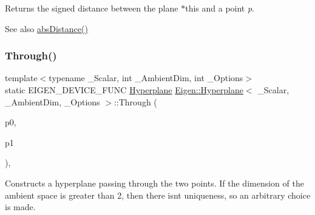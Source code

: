 \begin{DoxyReturn}{Returns}
the signed distance between the plane {\ttfamily $\ast$this} and a point {\itshape p}. 
\end{DoxyReturn}
\begin{DoxySeeAlso}{See also}
\mbox{\hyperlink{class_eigen_1_1_hyperplane_a95047840f0caed0bcb4f3ead9215d7b8}{abs\+Distance()}} 
\end{DoxySeeAlso}
\mbox{\label{class_eigen_1_1_hyperplane_ae0e7dc262623fc937b1b051595b8d3f1}} 
\subsubsection{\texorpdfstring{Through()}{Through()}\hspace{0.1cm}{\footnotesize\ttfamily [1/2]}}
{\footnotesize\ttfamily template$<$typename \+\_\+\+Scalar, int \+\_\+\+Ambient\+Dim, int \+\_\+\+Options$>$ \\
static E\+I\+G\+E\+N\+\_\+\+D\+E\+V\+I\+C\+E\+\_\+\+F\+U\+NC \mbox{\hyperlink{class_eigen_1_1_hyperplane}{Hyperplane}} \mbox{\hyperlink{class_eigen_1_1_hyperplane}{Eigen\+::\+Hyperplane}}$<$ \+\_\+\+Scalar, \+\_\+\+Ambient\+Dim, \+\_\+\+Options $>$\+::Through (\begin{DoxyParamCaption}\item[{const \mbox{\hyperlink{class_eigen_1_1_matrix}{Vector\+Type}} \&}]{p0,  }\item[{const \mbox{\hyperlink{class_eigen_1_1_matrix}{Vector\+Type}} \&}]{p1 }\end{DoxyParamCaption})\hspace{0.3cm}{\ttfamily [inline]}, {\ttfamily [static]}}

Constructs a hyperplane passing through the two points. If the dimension of the ambient space is greater than 2, then there isn\textquotesingle{}t uniqueness, so an arbitrary choice is made. \mbox{\label{class_eigen_1_1_hyperplane_ae105a4f5f2252069b1b1251207dca4e0}} 
